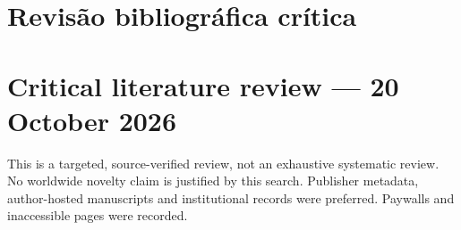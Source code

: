 \documentclass[
  11pt,
]{article}
\begin{document}
\hypertarget{revisuxe3o-bibliogruxe1fica-cruxedtica}{%
\section{Revisão bibliográfica
crítica}\label{revisuxe3o-bibliogruxe1fica-cruxedtica}}

\hypertarget{critical-literature-review-20-october-2026}{%
\section{Critical literature review --- 20 October
2026}\label{critical-literature-review-20-october-2026}}

This is a targeted, source-verified review, not an exhaustive systematic
review. No worldwide novelty claim is justified by this search.
Publisher metadata, author-hosted manuscripts and institutional records
were preferred. Paywalls and inaccessible pages were recorded.

\begingroup\footnotesize
\end{document}

